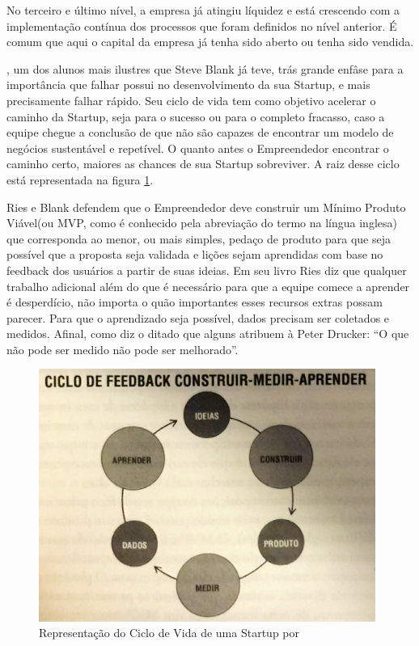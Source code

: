 No terceiro e último nível, a empresa já atingiu líquidez e está crescendo com a implementação contínua dos processos que foram definidos no nível anterior. É comum que aqui o capital da empresa já tenha sido aberto ou tenha sido vendida. 

, um dos alunos mais ilustres que Steve Blank já teve, trás grande enfâse para a importância que falhar possui no desenvolvimento da sua Startup, e mais precisamente falhar rápido. Seu ciclo de vida tem como objetivo acelerar o caminho da Startup, seja para o sucesso ou para o completo fracasso, caso a equipe chegue a conclusão de que não são capazes de encontrar um modelo de negócios sustentável e repetível. O quanto antes o Empreendedor encontrar o caminho certo, maiores as chances de sua Startup sobreviver. A raiz desse ciclo está representada na figura \ref{figure:ciclo_de_vida_eric_ries}.

Ries e Blank defendem que o Empreendedor deve construir um Mínimo Produto Viável(ou MVP, como é conhecido pela abreviação do termo na língua inglesa) que corresponda ao menor, ou mais simples, pedaço de produto para que seja possível que a proposta seja validada e lições sejam aprendidas com base no feedback dos usuários a partir de suas ideias. Em seu livro Ries diz que qualquer trabalho adicional além do que é necessário para que a equipe comece a aprender é desperdício, não importa o quão importantes esses recursos extras possam parecer. Para que o aprendizado seja possível, dados precisam ser coletados e medidos. Afinal, como diz o ditado que alguns atribuem à Peter Drucker: ``O que não pode ser medido não pode ser melhorado''. 

\begin{figure}[!htb]
\centering
\includegraphics[width=11cm,angle=0]{figuras/ciclo_de_vida_eric_ries}
\caption{Representação do Ciclo de Vida de uma Startup por \cite{Ries2011}}
\label{figure:ciclo_de_vida_eric_ries}
\end{figure}

